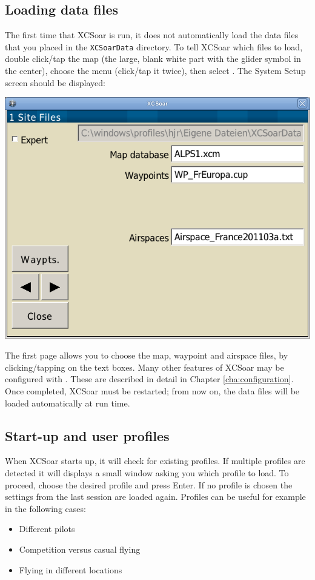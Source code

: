 \subsection*{Loading data files}
The first time that XCSoar is run, it does not automatically load the 
data files that you placed in the \verb|XCSoarData| directory.  
To tell XCSoar which files to load, double click/tap the map (the large,
blank white part with the glider symbol in the center),
choose the menu  (click/tap it twice), then select
.  The System Setup screen should be displayed:
\begin{center}
\includegraphics[angle=0,width=0.8\linewidth,keepaspectratio='true']{figures/config-basic.png}
\end{center}
The first page allows you to choose the map, 
waypoint and airspace files, by clicking/tapping on the text boxes.
Many other features of XCSoar may be configured with
. These are described in detail in Chapter
\ref{cha:configuration}.
Once completed, XCSoar must be restarted; from now on, the data files
will be loaded automatically at run time.

\subsection*{Start-up and user profiles}
When XCSoar starts up, it will check for existing profiles. If multiple
profiles are detected it will displays a small window asking you which profile
to load. To proceed, choose the desired profile and press Enter. If no
profile is chosen the settings from the last session are loaded again. Profiles
can be useful for example in the following cases:
\begin{itemize}
\item Different pilots
\item Competition versus casual flying
\item Flying in different locations
\end{itemize}


